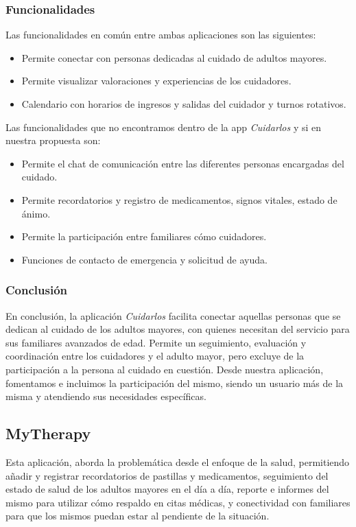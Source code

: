\documentclass[a4paper,12pt]{article}
\begin{document}
    \subsubsection{Funcionalidades}
    \par Las funcionalidades en común entre ambas aplicaciones son las siguientes:
    \begin{itemize}
        \item Permite conectar con personas dedicadas al cuidado de adultos mayores.
        \item Permite visualizar valoraciones y experiencias de los cuidadores.
        \item Calendario con horarios de ingresos y salidas del cuidador y turnos rotativos.
    \end{itemize}
    \par Las funcionalidades que no encontramos dentro de la app \textit{Cuidarlos} y si en nuestra propuesta son:
    \begin{itemize}
        \item Permite el chat de comunicación entre las diferentes personas encargadas del cuidado.
        \item Permite recordatorios y registro de medicamentos, signos vitales, estado de ánimo.
        \item Permite la participación entre familiares cómo cuidadores.
        \item Funciones de contacto de emergencia y solicitud de ayuda.
    \end{itemize}
    \subsubsection{Conclusión}
    \par En conclusión, la aplicación \textit{Cuidarlos} facilita conectar aquellas personas que se dedican al cuidado de los adultos mayores, con quienes necesitan del servicio para sus familiares avanzados de edad. Permite un seguimiento, evaluación y coordinación entre los cuidadores y el adulto mayor, pero excluye de la participación a la persona al cuidado en cuestión. Desde nuestra aplicación, fomentamos e incluimos la participación del mismo, siendo un usuario más de la misma y atendiendo sus necesidades específicas.
    \subsection{MyTherapy}
    \par Esta aplicación, aborda la problemática desde el enfoque de la salud, permitiendo añadir y registrar recordatorios de pastillas y medicamentos, seguimiento del estado de salud de los adultos mayores en el día a día, reporte e informes del mismo para utilizar cómo respaldo en citas médicas, y conectividad con familiares para que los mismos puedan estar al pendiente de la situación.
\end{document}
